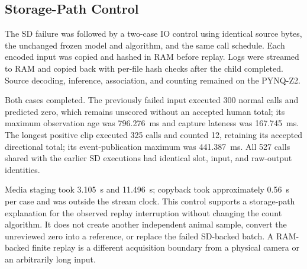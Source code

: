 \subsection{Storage-Path Control}
The SD failure was followed by a two-case IO control using identical source bytes, the unchanged frozen model and algorithm, and the same call schedule. Each encoded input was copied and hashed in RAM before replay. Logs were streamed to RAM and copied back with per-file hash checks after the child completed. Source decoding, inference, association, and counting remained on the PYNQ-Z2.

Both cases completed. The previously failed input executed 300 normal calls and predicted zero, which remains unscored without an accepted human total; its maximum observation age was 796.276~ms and capture lateness was 167.745~ms. The longest positive clip executed 325 calls and counted 12, retaining its accepted directional total; its event-publication maximum was 441.387~ms. All 527 calls shared with the earlier SD executions had identical slot, input, and raw-output identities.

Media staging took 3.105~s and 11.496~s; copyback took approximately 0.56~s per case and was outside the stream clock. This control supports a storage-path explanation for the observed replay interruption without changing the count algorithm. It does not create another independent animal sample, convert the unreviewed zero into a reference, or replace the failed SD-backed batch. A RAM-backed finite replay is a different acquisition boundary from a physical camera or an arbitrarily long input.
